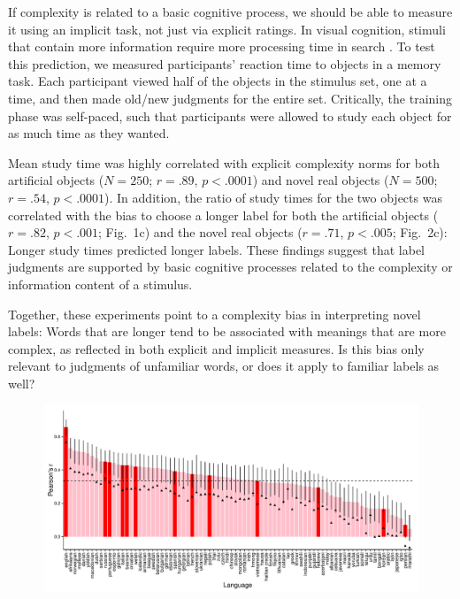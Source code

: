 \documentclass[12pt]{article}
\begin{document}
If complexity is related to a basic cognitive process, we should be able to measure it using an implicit task, not just via explicit ratings. In visual cognition, stimuli that contain more information require more processing time in search \cite{alvarez2004}. To test this prediction, we measured participants' reaction time to objects in a memory task. Each participant viewed half of the objects in the stimulus set, one at a time, and then made old/new judgments for the entire set. Critically, the training phase was self-paced, such that participants were allowed to study each object for as much time as they wanted. 
					
Mean study time was highly correlated with explicit complexity norms for both artificial objects ($N = 250$; $r = .89$, $p < .0001$) and novel real objects ($N = 500$; $r = .54$, $p < .0001$). In addition, the ratio of study times for the two objects was correlated with the bias to choose a longer label for both the artificial objects ($r = .82$, $p < .001$; Fig.\ 1c) and the novel real objects ($r = .71$, $p < .005$; Fig.\ 2c): Longer study times predicted longer labels. These findings suggest that label judgments are supported by basic cognitive processes related to the complexity or information content of a stimulus. 
					
Together, these experiments point to a complexity bias in interpreting novel labels: Words that are longer tend to be associated with meanings that are more complex, as reflected in both explicit and implicit measures. Is this bias only relevant to judgments of unfamiliar words, or does it apply to familiar labels as well? 

\begin{figure}[t]
\begin{center}
\includegraphics[scale = .53]{figs/xling.pdf}
\caption{} %
\end{center}
\label{fig:real_objs}
\end{figure}
\end{document}
